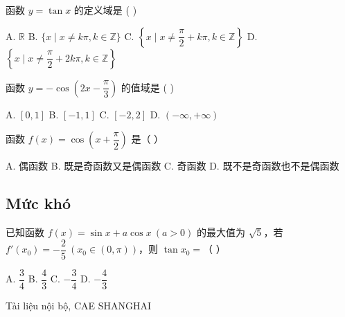 \documentclass[11pt, a4paper]{article}
\begin{document}
\begin{baitap}[7]
函数 $y = \tan x$ 的定义域是 ( )
\par\vspace{3pt}
\noindent A. $\mathbb{R}$ \quad B. $\{x \mid x \ne k\pi, k \in \mathbb{Z}\}$ \quad C. $\left\{x \mid x \ne \dfrac{\pi}{2} + k\pi, k \in \mathbb{Z}\right\}$ \quad D. $\left\{x \mid x \ne \dfrac{\pi}{2} + 2k\pi, k \in \mathbb{Z}\right\}$
\end{baitap}
\begin{baitap}[8]
函数 $y = -\cos\!\left(2x - \dfrac{\pi}{3}\right)$ 的值域是 ( )
\par\vspace{3pt}
\noindent A. $[0,1]$ \quad B. $[-1,1]$ \quad C. $[-2,2]$ \quad D. $(-\infty, +\infty)$
\end{baitap}
\begin{baitap}[9]
函数 $f(x) = \cos\!\left(x + \dfrac{\pi}{2}\right)$ 是（ ）
\par\vspace{3pt}
\noindent A. 偶函数 \quad B. 既是奇函数又是偶函数 \quad C. 奇函数 \quad D. 既不是奇函数也不是偶函数
\end{baitap}
\subsection{Mức khó}

\begin{baitap}[10]
已知函数 $f(x) = \sin x + a\cos x \ (a > 0)$ 的最大值为 $\sqrt{5}$，若 $f'(x_0) = -\dfrac{2}{5} \ (x_0 \in (0, \pi))$，则 $\tan x_0 =$（ ）
\par\vspace{3pt}
\noindent A. $\dfrac{3}{4}$ \quad B. $\dfrac{4}{3}$ \quad C. $-\dfrac{3}{4}$ \quad D. $-\dfrac{4}{3}$
\end{baitap}
\vspace{0.8cm}
\begin{center}
{\footnotesize\color{cae_blue} Tài liệu nội bộ, CAE SHANGHAI}
\end{center}
\end{document}
